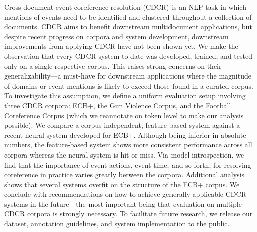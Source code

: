 Cross-document event coreference resolution (CDCR) is an NLP task in which mentions of events need to be identified and clustered throughout a collection of documents. CDCR aims to benefit downstream multidocument applications, but despite recent progress on corpora and system development, downstream improvements from applying CDCR have not been shown yet. We make the observation that every CDCR system to date was developed, trained, and tested only on a single respective corpus. This raises strong concerns on their generalizability—a must-have for downstream applications where the magnitude of domains or event mentions is likely to exceed those found in a curated corpus. To investigate this assumption, we define a uniform evaluation setup involving three CDCR corpora: ECB+, the Gun Violence Corpus, and the Football Coreference Corpus (which we reannotate on token level to make our analysis possible). We compare a corpus-independent, feature-based system against a recent neural system developed for ECB+. Although being inferior in absolute numbers, the feature-based system shows more consistent performance across all corpora whereas the neural system is hit-or-miss. Via model introspection, we find that the importance of event actions, event time, and so forth, for resolving coreference in practice varies greatly between the corpora. Additional analysis shows that several systems overfit on the structure of the ECB+ corpus. We conclude with recommendations on how to achieve generally applicable CDCR systems in the future—the most important being that evaluation on multiple CDCR corpora is strongly necessary. To facilitate future research, we release our dataset, annotation guidelines, and system implementation to the public.